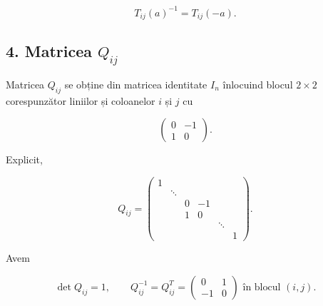 \documentclass[12pt]{article}
\theoremstyle{definition}
\theoremstyle{plain}
\begin{document}
\[
T_{ij}(a)^{-1} = T_{ij}(-a).
\]



\subsection*{4. Matricea $Q_{ij}$}

Matricea $Q_{ij}$ se obține din matricea identitate $I_n$ înlocuind blocul $2\times 2$
corespunzător liniilor și coloanelor $i$ și $j$ cu



\[
\begin{pmatrix}
0 & -1 \\
1 & 0
\end{pmatrix}.
\]



Explicit,


\[
Q_{ij} =
\begin{pmatrix}
1      &        &        &        &        &        \\
       & \ddots &        &        &        &        \\
       &        & 0      & -1     &        &        \\
       &        & 1      & 0      &        &        \\
       &        &        &        & \ddots &        \\
       &        &        &        &        & 1
\end{pmatrix}.
\]



Avem


\[
\det Q_{ij} = 1, \qquad Q_{ij}^{-1} = Q_{ij}^T =
\begin{pmatrix}
0 & 1 \\
-1 & 0
\end{pmatrix}
\text{ în blocul } (i,j).
\]
\end{document}
